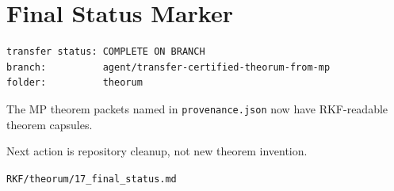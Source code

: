 \hypertarget{final-status-marker}{%
\chapter{Final Status Marker}\label{final-status-marker}}

\begin{verbatim}
transfer status: COMPLETE ON BRANCH
branch:          agent/transfer-certified-theorum-from-mp
folder:          theorum
\end{verbatim}

The MP theorem packets named in \texttt{provenance.json} now have RKF-readable theorem capsules.

Next action is repository cleanup, not new theorem invention.

\begin{flushright}\small\texttt{RKF/theorum/17\_final\_status.md}\end{flushright}
